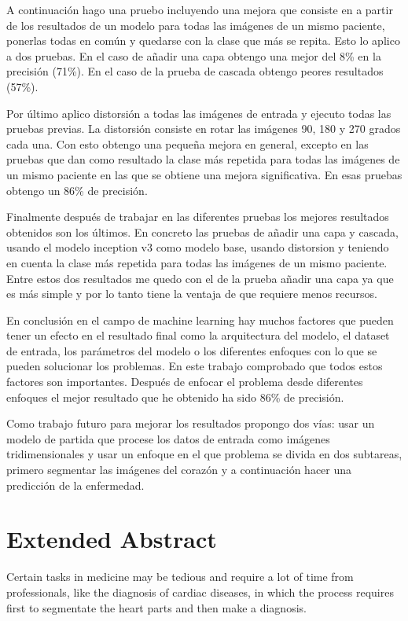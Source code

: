 \documentclass[12pt,a4paper]{article}
\begin{document}
A continuación hago una pruebo incluyendo una mejora que consiste en a partir de los resultados de un modelo para todas las imágenes de un mismo paciente, ponerlas todas en común y quedarse con la clase que más se repita. Esto lo aplico a dos pruebas. En el caso de añadir una capa obtengo una mejor del 8\% en la precisión (71\%). En el caso de la prueba de cascada obtengo peores resultados (57\%).
\bigskip

Por último aplico distorsión a todas las imágenes de entrada y ejecuto todas las pruebas previas. La distorsión consiste en rotar las imágenes 90, 180 y 270 grados cada una. Con esto obtengo una pequeña mejora en general, excepto en las pruebas que dan como resultado la clase más repetida para todas las imágenes de un mismo paciente en las que se obtiene una mejora significativa. En esas pruebas obtengo un 86\% de precisión.
\bigskip

Finalmente después de trabajar en las diferentes pruebas los mejores resultados obtenidos son los últimos. En concreto las pruebas de añadir una capa y cascada, usando el modelo inception v3 como modelo base, usando distorsion y teniendo en cuenta la clase más repetida para todas las imágenes de un mismo paciente. Entre estos dos resultados me quedo con el de la prueba añadir una capa ya que es más simple y por lo tanto tiene la ventaja de que requiere menos recursos.
\bigskip

En conclusión en el campo de machine learning hay muchos factores que pueden tener un efecto en el resultado final como la arquitectura del modelo, el dataset de entrada, los parámetros del modelo o los diferentes enfoques con lo que se pueden solucionar los problemas. En este trabajo comprobado que todos estos factores son importantes. Después de enfocar el problema desde diferentes enfoques el mejor resultado que he obtenido ha sido 86\% de precisión.
\bigskip

Como trabajo futuro para mejorar los resultados propongo dos vías: usar un modelo de partida que procese los datos de entrada como imágenes tridimensionales y usar un enfoque en el que problema se divida en dos subtareas, primero segmentar las imágenes del corazón y a continuación hacer una predicción de la enfermedad.

\newpage
\section*{Extended Abstract}
Certain tasks in medicine may be tedious and require a lot of time from professionals, like the diagnosis of cardiac diseases, in which the process requires first to segmentate the heart parts and then make a diagnosis.
\bigskip
\end{document}
